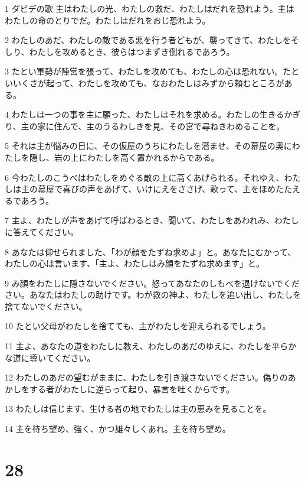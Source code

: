 \par 1 ダビデの歌 主はわたしの光、わたしの救だ、わたしはだれを恐れよう。主はわたしの命のとりでだ。わたしはだれをおじ恐れよう。
\par 2 わたしのあだ、わたしの敵である悪を行う者どもが、襲ってきて、わたしをそしり、わたしを攻めるとき、彼らはつまずき倒れるであろう。
\par 3 たとい軍勢が陣営を張って、わたしを攻めても、わたしの心は恐れない。たといいくさが起って、わたしを攻めても、なおわたしはみずから頼むところがある。
\par 4 わたしは一つの事を主に願った、わたしはそれを求める。わたしの生きるかぎり、主の家に住んで、主のうるわしきを見、その宮で尋ねきわめることを。
\par 5 それは主が悩みの日に、その仮屋のうちにわたしを潜ませ、その幕屋の奥にわたしを隠し、岩の上にわたしを高く置かれるからである。
\par 6 今わたしのこうべはわたしをめぐる敵の上に高くあげられる。それゆえ、わたしは主の幕屋で喜びの声をあげて、いけにえをささげ、歌って、主をほめたたえるであろう。
\par 7 主よ、わたしが声をあげて呼ばわるとき、聞いて、わたしをあわれみ、わたしに答えてください。
\par 8 あなたは仰せられました、「わが顔をたずね求めよ」と。あなたにむかって、わたしの心は言います、「主よ、わたしはみ顔をたずね求めます」と。
\par 9 み顔をわたしに隠さないでください。怒ってあなたのしもべを退けないでください。あなたはわたしの助けです。わが救の神よ、わたしを追い出し、わたしを捨てないでください。
\par 10 たとい父母がわたしを捨てても、主がわたしを迎えられるでしょう。
\par 11 主よ、あなたの道をわたしに教え、わたしのあだのゆえに、わたしを平らかな道に導いてください。
\par 12 わたしのあだの望むがままに、わたしを引き渡さないでください。偽りのあかしをする者がわたしに逆らって起り、暴言を吐くからです。
\par 13 わたしは信じます、生ける者の地でわたしは主の恵みを見ることを。
\par 14 主を待ち望め、強く、かつ雄々しくあれ。主を待ち望め。

\chapter{28}

